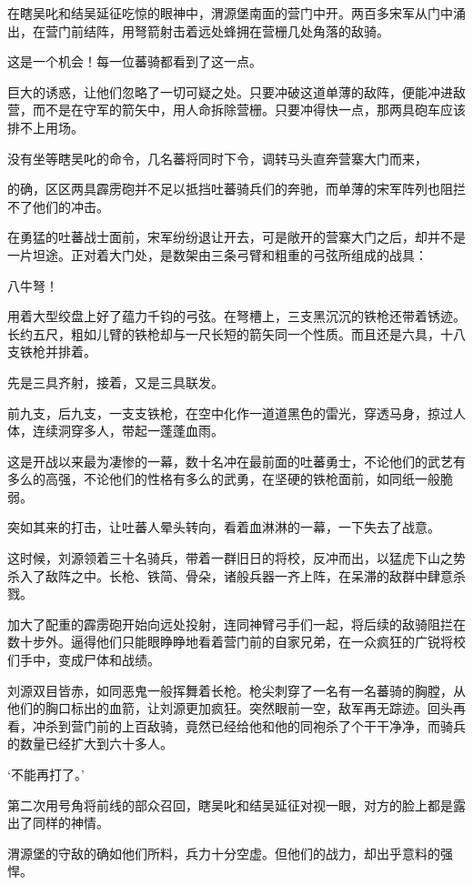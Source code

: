 在瞎吴叱和结吴延征吃惊的眼神中，渭源堡南面的营门中开。两百多宋军从门中涌出，在营门前结阵，用弩箭射击着远处蜂拥在营栅几处角落的敌骑。

这是一个机会！每一位蕃骑都看到了这一点。

巨大的诱惑，让他们忽略了一切可疑之处。只要冲破这道单薄的敌阵，便能冲进敌营，而不是在守军的箭矢中，用人命拆除营栅。只要冲得快一点，那两具砲车应该排不上用场。

没有坐等瞎吴叱的命令，几名蕃将同时下令，调转马头直奔营寨大门而来，

的确，区区两具霹雳砲并不足以抵挡吐蕃骑兵们的奔驰，而单薄的宋军阵列也阻拦不了他们的冲击。

在勇猛的吐蕃战士面前，宋军纷纷退让开去，可是敞开的营寨大门之后，却并不是一片坦途。正对着大门处，是数架由三条弓臂和粗重的弓弦所组成的战具：

八牛弩！

用着大型绞盘上好了蕴力千钧的弓弦。在弩槽上，三支黑沉沉的铁枪还带着锈迹。长约五尺，粗如儿臂的铁枪却与一尺长短的箭矢同一个性质。而且还是六具，十八支铁枪并排着。

先是三具齐射，接着，又是三具联发。

前九支，后九支，一支支铁枪，在空中化作一道道黑色的雷光，穿透马身，掠过人体，连续洞穿多人，带起一蓬蓬血雨。

这是开战以来最为凄惨的一幕，数十名冲在最前面的吐蕃勇士，不论他们的武艺有多么的高强，不论他们的性格有多么的武勇，在坚硬的铁枪面前，如同纸一般脆弱。

突如其来的打击，让吐蕃人晕头转向，看着血淋淋的一幕，一下失去了战意。

这时候，刘源领着三十名骑兵，带着一群旧日的将校，反冲而出，以猛虎下山之势杀入了敌阵之中。长枪、铁简、骨朵，诸般兵器一齐上阵，在呆滞的敌群中肆意杀戮。

加大了配重的霹雳砲开始向远处投射，连同神臂弓手们一起，将后续的敌骑阻拦在数十步外。逼得他们只能眼睁睁地看着营门前的自家兄弟，在一众疯狂的广锐将校们手中，变成尸体和战绩。

刘源双目皆赤，如同恶鬼一般挥舞着长枪。枪尖刺穿了一名有一名蕃骑的胸膛，从他们的胸口标出的血箭，让刘源更加疯狂。突然眼前一空，敌军再无踪迹。回头再看，冲杀到营门前的上百敌骑，竟然已经给他和他的同袍杀了个干干净净，而骑兵的数量已经扩大到六十多人。

‘不能再打了。’

第二次用号角将前线的部众召回，瞎吴叱和结吴延征对视一眼，对方的脸上都是露出了同样的神情。

渭源堡的守敌的确如他们所料，兵力十分空虚。但他们的战力，却出乎意料的强悍。

